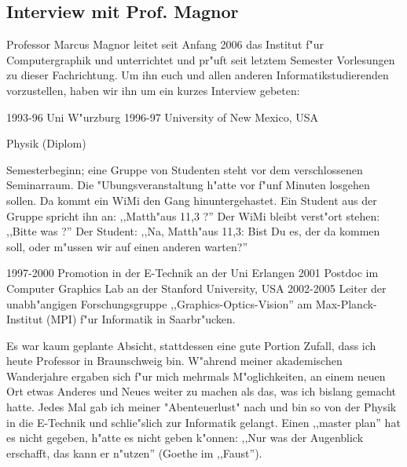 \subsection{Interview mit Prof. Magnor}

Professor Marcus Magnor leitet seit Anfang 2006 das Institut f"ur Computergraphik und unterrichtet und pr"uft seit letztem Semester Vorlesungen zu dieser Fachrichtung. Um ihn euch und allen anderen Informatikstudierenden vorzustellen, haben wir ihn um ein kurzes Interview gebeten:



1993-96 Uni W"urzburg 1996-97 University of New Mexico, USA


Physik (Diplom)


Semesterbeginn; eine Gruppe von Studenten steht vor dem verschlossenen Seminarraum. Die "Ubungsveranstaltung h"atte vor f"unf Minuten losgehen sollen. Da kommt ein WiMi den Gang hinuntergehastet. Ein Student aus der Gruppe spricht ihn an: ,,Matth"aus 11,3 ?'' Der WiMi bleibt verst"ort stehen: ,,Bitte was ?'' Der Student: ,,Na, Matth"aus 11,3: Bist Du es, der da kommen soll, oder m"ussen wir auf einen anderen warten?''


1997-2000 Promotion in der E-Technik an der Uni Erlangen
2001 Postdoc im Computer Graphics Lab an der Stanford University, USA
2002-2005 Leiter der unabh"angigen Forschungsgruppe
,,Graphics-Optics-Vision'' am Max-Planck-Institut (MPI) f"ur Informatik in Saarbr"ucken.


Es war kaum geplante Absicht, stattdessen eine gute Portion Zufall, dass ich heute Professor in Braunschweig bin. W"ahrend meiner akademischen Wanderjahre ergaben sich f"ur mich mehrmals M"oglichkeiten, an einem neuen Ort etwas Anderes und Neues weiter zu machen als das, was ich bislang gemacht hatte. Jedes Mal gab ich meiner "Abenteuerlust" nach und bin so von der Physik in die E-Technik und schlie"slich zur Informatik gelangt. Einen ,,master plan'' hat es nicht gegeben, h"atte es nicht geben k"onnen: ,,Nur was der Augenblick erschafft, das kann er n"utzen'' (Goethe im ,,Faust'').

